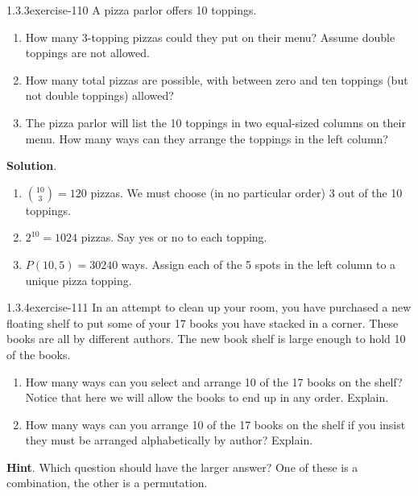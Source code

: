 \documentclass[twoside,11pt,]{book}
\numberwithin{equation}{chapter}
\begin{document}
\begin{divisionsolution}{1.3.3}{}{exercise-110}%
\hypertarget{p-1826}{}%
A pizza parlor offers 10 toppings.\leavevmode%
\begin{enumerate}[label=(\alph*)]
\item\hypertarget{li-1234}{}\hypertarget{p-1827}{}%
How many 3-topping pizzas could they put on their menu? Assume double toppings are not allowed.%
\item\hypertarget{li-1235}{}\hypertarget{p-1829}{}%
How many total pizzas are possible, with between zero and ten toppings (but not double toppings) allowed?%
\item\hypertarget{li-1236}{}\hypertarget{p-1831}{}%
The pizza parlor will list the 10 toppings in two equal-sized columns on their menu. How many ways can they arrange the toppings in the left column?%
\end{enumerate}
%
\par\smallskip%
\noindent\textbf{Solution}.\quad%
\hypertarget{p-1833}{}%
\leavevmode%
\begin{enumerate}[label=(\alph*)]
\item\hypertarget{li-1237}{}\hypertarget{p-1834}{}%
\({10 \choose 3} = 120\) pizzas. We must choose (in no particular order) 3 out of the 10 toppings.%
\item\hypertarget{li-1238}{}\hypertarget{p-1835}{}%
\(2^{10} = 1024\) pizzas. Say yes or no to each topping.%
\item\hypertarget{li-1239}{}\hypertarget{p-1836}{}%
\(P(10,5) = 30240\) ways. Assign each of the 5 spots in the left column to a unique pizza topping.%
\end{enumerate}
%
\end{divisionsolution}%
\begin{divisionsolution}{1.3.4}{}{exercise-111}%
\hypertarget{p-1837}{}%
In an attempt to clean up your room, you have purchased a new floating shelf to put some of your 17 books you have stacked in a corner. These books are all by different authors. The new book shelf is large enough to hold 10 of the books.\leavevmode%
\begin{enumerate}[label=(\alph*)]
\item\hypertarget{li-1240}{}\hypertarget{p-1838}{}%
How many ways can you select and arrange 10 of the 17 books on the shelf? Notice that here we will allow the books to end up in any order. Explain.%
\item\hypertarget{li-1241}{}\hypertarget{p-1839}{}%
How many ways can you arrange 10 of the 17 books on the shelf if you insist they must be arranged alphabetically by author? Explain.%
\end{enumerate}
%
\par\smallskip%
\noindent\textbf{Hint}.\quad%
\hypertarget{p-1840}{}%
Which question should have the larger answer?  One of these is a combination, the other is a permutation.%
\end{divisionsolution}%
\end{document}
